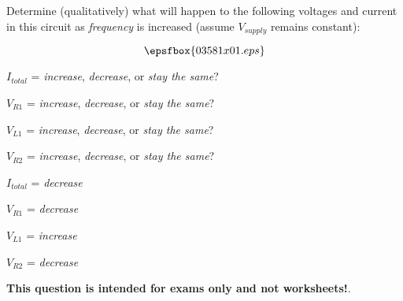 

Determine (qualitatively) what will happen to the following voltages and current in this circuit as {\it frequency} is increased (assume $V_{supply}$ remains constant):

$$\epsfbox{03581x01.eps}$$

$I_{total}$ = {\it increase}, {\it decrease}, or {\it stay the same}?

\vskip 10pt

$V_{R1}$ = {\it increase}, {\it decrease}, or {\it stay the same}? 

\vskip 10pt

$V_{L1}$ = {\it increase}, {\it decrease}, or {\it stay the same}? 

\vskip 10pt

$V_{R2}$ = {\it increase}, {\it decrease}, or {\it stay the same}? 







$I_{total}$ = {\it decrease}

\vskip 10pt

$V_{R1}$ = {\it decrease} 

\vskip 10pt

$V_{L1}$ = {\it increase}

\vskip 10pt

$V_{R2}$ = {\it decrease}







{\bf This question is intended for exams only and not worksheets!}.



